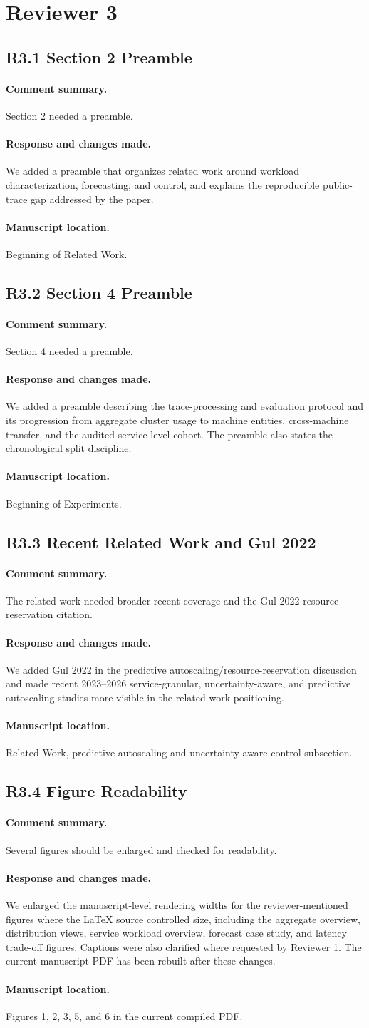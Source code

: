 \documentclass[11pt]{article}
\newcommand{\resp}[3]{\paragraph{Comment summary.} #1\par\paragraph{Response and changes made.} #2\par\paragraph{Manuscript location.} #3\par}
\begin{document}
\section*{Reviewer 3}

\subsection*{R3.1 Section 2 Preamble}
\resp{Section 2 needed a preamble.}{We added a preamble that organizes related work around workload characterization, forecasting, and control, and explains the reproducible public-trace gap addressed by the paper.}{Beginning of Related Work.}

\subsection*{R3.2 Section 4 Preamble}
\resp{Section 4 needed a preamble.}{We added a preamble describing the trace-processing and evaluation protocol and its progression from aggregate cluster usage to machine entities, cross-machine transfer, and the audited service-level cohort. The preamble also states the chronological split discipline.}{Beginning of Experiments.}

\subsection*{R3.3 Recent Related Work and Gul 2022}
\resp{The related work needed broader recent coverage and the Gul 2022 resource-reservation citation.}{We added Gul 2022 in the predictive autoscaling/resource-reservation discussion and made recent 2023--2026 service-granular, uncertainty-aware, and predictive autoscaling studies more visible in the related-work positioning.}{Related Work, predictive autoscaling and uncertainty-aware control subsection.}

\subsection*{R3.4 Figure Readability}
\resp{Several figures should be enlarged and checked for readability.}{We enlarged the manuscript-level rendering widths for the reviewer-mentioned figures where the LaTeX source controlled size, including the aggregate overview, distribution views, service workload overview, forecast case study, and latency trade-off figures. Captions were also clarified where requested by Reviewer 1. The current manuscript PDF has been rebuilt after these changes.}{Figures 1, 2, 3, 5, and 6 in the current compiled PDF.}
\end{document}
